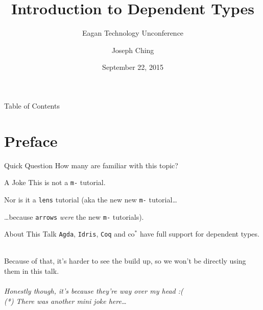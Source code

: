 \documentclass[xcolor={usenames,dvipsnames}]{beamer}
\title{Introduction to Dependent Types}
\subtitle{Eagan Technology Unconference}
\author{Joseph Ching}
\date{September 22, 2015}
\begin{document}
\begin{frame}[plain]
  \titlepage
\end{frame}


\begin{frame}{Table of Contents}
  \tableofcontents[
    pausesections,
    sectionstyle=show,
    subsectionstyle=hide
  ]
\end{frame}


\section{Preface}

\begin{frame}{Quick Question}
  How many are familiar with this topic?
\end{frame}

\begin{frame}{A Joke}
  This is not a \texttt{m-} tutorial.

  \pause

  Nor is it a \texttt{lens} tutorial
  \pause
  (aka the new new \texttt{m-} tutorial\ldots

  \pause
  \ldots because \texttt{arrows} \textit{were} the new \texttt{m-} tutorials).

\end{frame}


\begin{frame}{About This Talk}
    \texttt{Agda}, \texttt{Idris}, \texttt{Coq} and co$^*$ have full support for dependent types.

    \ \\
    \pause
    Because of that, it's harder to see the build up, so we won't be directly using them in this talk.
    \ \\
    \ \\
    \pause
    \textit{\tiny{Honestly though, it's because they're way over my head :(}}\\
    \textit{\tiny{(*) There was another mini joke here\ldots}}
\end{frame}
\end{document}

